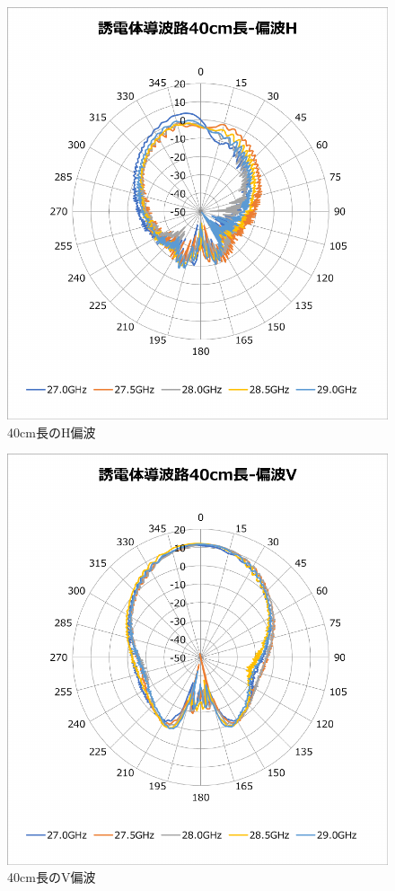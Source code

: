 \documentclass[technicalreport]{ieicej}
\begin{document}
\begin{figure}[tb]
  \begin{center}
    \includegraphics[bb=0 0 408 430, width=0.9\linewidth]{img/waveguide-40cm-h.pdf}
    \caption{40cm長のH偏波}
    \label{fig:40cm-h}
  \end{center}
\end{figure}

\begin{figure}[tb]
  \begin{center}
    \includegraphics[bb=0 0 408 430, width=0.9\linewidth]{img/waveguide-40cm-v.pdf}
    \caption{40cm長のV偏波}
    \label{fig:40cm-v}
  \end{center}
\end{figure}
\end{document}
